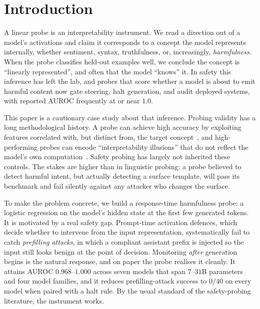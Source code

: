 \documentclass{article}
\begin{document}
\section{Introduction}
\label{sec:intro}

A linear probe is an interpretability instrument. We read a direction out of a model's activations and claim it corresponds to a concept the model represents internally, whether sentiment, syntax, truthfulness, or, increasingly, \emph{harmfulness}. When the probe classifies held-out examples well, we conclude the concept is ``linearly represented'', and often that the model ``knows'' it. In safety this inference has left the lab, and probes that score whether a model is about to emit harmful content now gate steering, halt generation, and audit deployed systems, with reported AUROC frequently at or near $1.0$.

This paper is a cautionary case study about that inference. Probing validity has a long methodological history. A probe can achieve high accuracy by exploiting features correlated with, but distinct from, the target concept~\citep{hewitt2019control,belinkov2022probing}, and high-performing probes can encode ``interpretability illusions'' that do not reflect the model's own computation~\citep{bolukbasi2021illusion}. Safety probing has largely not inherited these controls. The stakes are higher than in linguistic probing: a probe believed to detect harmful intent, but actually detecting a surface template, will pass its benchmark and fail silently against any attacker who changes the surface.

To make the problem concrete, we build a response-time harmfulness probe: a logistic regression on the model's hidden state at the first few generated tokens. It is motivated by a real safety gap. Prompt-time activation defences, which decide whether to intervene from the input representation, systematically fail to catch \emph{prefilling attacks}, in which a compliant assistant prefix is injected so the input still looks benign at the point of decision. Monitoring \emph{after} generation begins is the natural response, and on paper the probe realises it cleanly. It attains AUROC $0.968$--$1.000$ across seven models that span $7$--$31$B parameters and four model families, and it reduces prefilling-attack success to $0/40$ on every model when paired with a halt rule. By the usual standard of the safety-probing literature, the instrument works.
\end{document}
